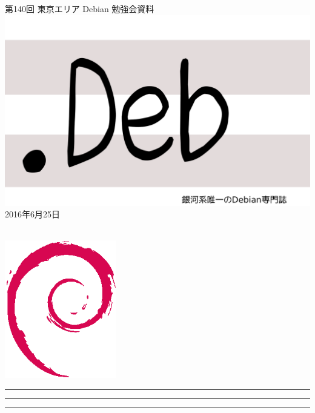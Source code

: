 \documentclass[mingoth,a4paper]{jsarticle}
\newcommand{\debmtgyear}{2016}
\newcommand{\debmtgmonth}{6}
\newcommand{\debmtgdate}{25}
\newcommand{\debmtgnumber}{140}
\begin{document}
\begin{titlepage}
\thispagestyle{empty}

\vspace*{-2cm}
第\debmtgnumber{}回 東京エリア Debian 勉強会資料\\
\hspace*{-2cm}
\includegraphics{image2012-natsu/dotdeb.pdf}\\
\hfill{}\debmtgyear{}年\debmtgmonth{}月\debmtgdate{}日

\\

\vspace*{-2cm}
\hfill{}\includegraphics[height=6cm]{image200502/openlogo-nd.eps}
\end{titlepage}

\newpage

\begin{minipage}[b]{0.2\hsize}
 \colorbox{titleback}{}
\end{minipage}
\begin{minipage}[b]{0.8\hsize}
\hrule
\vspace{2mm}
\hrule
\begin{multicols}{2}
\tableofcontents
\end{multicols}
\vspace{2mm}
\hrule
\end{minipage}
\end{document}
